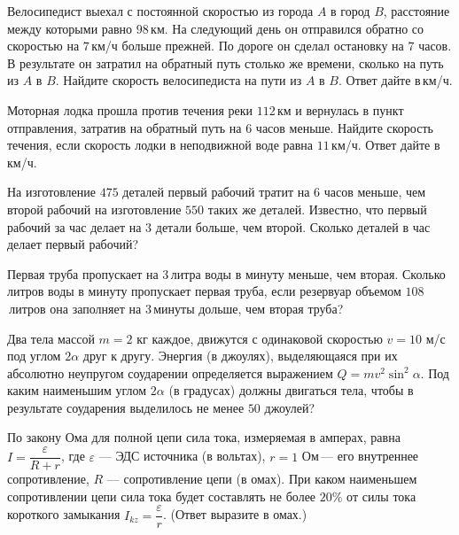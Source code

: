 \begin{class}[number=7]
\begin{listofex}
		\item Велосипедист выехал с постоянной скоростью из города \(A\) в город \(B\), расстояние между которыми равно \(98\) км. На следующий день он отправился обратно со скоростью на \(7\) км/ч больше прежней. По дороге он сделал остановку на \(7\) часов. В результате он затратил на обратный путь столько же времени, сколько на путь из \(A\) в \(B\). Найдите скорость велосипедиста на пути из \(A\) в \(B\). Ответ дайте в км/ч.
		\item Моторная лодка прошла против течения реки \(112\) км и вернулась в пункт отправления, затратив на обратный путь на \(6\) часов меньше. Найдите скорость течения, если скорость лодки в неподвижной воде равна \(11\) км/ч. Ответ дайте в км/ч.
		\item На изготовление \(475\) деталей первый рабочий тратит на \(6\) часов меньше, чем второй рабочий на изготовление \(550\) таких же деталей. Известно, что первый рабочий за час делает на \(3\) детали больше, чем второй. Сколько деталей в час делает первый рабочий?
		\item Первая труба пропускает на \(3\) литра воды в минуту меньше, чем вторая. Сколько литров воды в минуту пропускает первая труба, если резервуар объемом \(108\) литров она заполняет на \(3\) минуты дольше, чем вторая труба?
		\item Два тела массой \(m=2\) кг каждое, движутся с одинаковой скоростью  \(v =10\) м/с под углом \(2\alpha\) друг к другу. Энергия (в джоулях), выделяющаяся при их абсолютно неупругом соударении определяется выражением \(Q = m v^2\sin^2 \alpha \). Под каким наименьшим углом \(2\alpha\) (в градусах) должны двигаться тела, чтобы в результате соударения выделилось не менее \(50\) джоулей?
		\item По закону Ома для полной цепи сила тока, измеряемая в амперах, равна \( I=\dfrac{ \varepsilon }{ R+r } \), где \(\varepsilon\) --- ЭДС источника (в вольтах), \(r=1\) Ом --- его внутреннее сопротивление, \(R\) --- сопротивление цепи (в омах). При каком наименьшем сопротивлении цепи сила тока будет составлять не более \(20\%\) от силы тока короткого замыкания \(I_{kz}=\dfrac{ \varepsilon }{ r }\). (Ответ выразите в омах.)
	\end{listofex}
\end{class}

